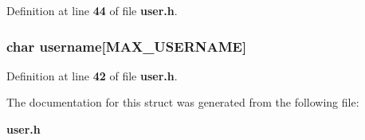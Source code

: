Definition at line {\bf 44} of file {\bf user.\+h}.

\subsubsection[{username}]{\setlength{\rightskip}{0pt plus 5cm}char username[{\bf M\+A\+X\+\_\+\+U\+S\+E\+R\+N\+A\+M\+E}]}\label{struct_user_a63e4da517f59a6510a3b12d66f7e306e}


Definition at line {\bf 42} of file {\bf user.\+h}.



The documentation for this struct was generated from the following file\+:\begin{DoxyCompactItemize}
\item 
{\bf user.\+h}\end{DoxyCompactItemize}
